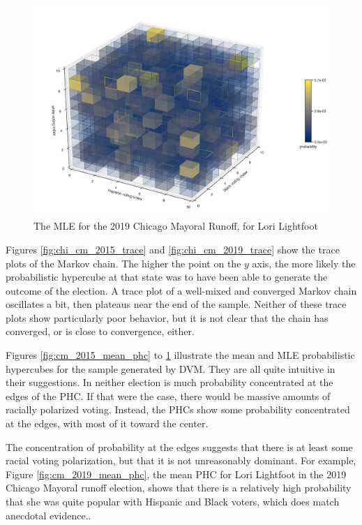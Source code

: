 \begin{figure}[ht]\centering
 \includegraphics[width=\linewidth]{figures/cm_2019_mle_phc.png}
 \caption{The MLE for the 2019 Chicago Mayoral Runoff, for Lori Lightfoot}
 \label{fig:cm_2019_mle_phc}
\end{figure}

Figures \ref{fig:chi_cm_2015_trace} and \ref{fig:chi_cm_2019_trace} show the trace plots of the Markov chain. The higher the point on the $y$ axis, the more likely the probabilistic hypercube at that state was to have been able to generate the outcome of the election. A trace plot of a well-mixed and converged Markov chain oscillates a bit, then plateaus near the end of the sample. Neither of these trace plots show particularly poor behavior, but it is not clear that the chain has converged, or is close to convergence, either.

Figures \ref{fig:cm_2015_mean_phc} to \ref{fig:cm_2019_mle_phc} illustrate the mean and MLE probabilistic hypercubes for the sample generated by DVM. They are all quite intuitive in their suggestions. In neither election is much probability concentrated at the edges of the PHC. If that were the case, there would be massive amounts of racially polarized voting. Instead, the PHCs show some probability concentrated at the edges, with most of it toward the center.

The concentration of probability at the edges suggests that there is at least some racial voting polarization, but that it is not unreasonably dominant. For example, Figure \ref{fig:cm_2019_mean_phc}, the mean PHC for Lori Lightfoot in the 2019 Chicago Mayoral runoff election, shows that there is a relatively high probability that she was quite popular with Hispanic and Black voters, which does match anecdotal evidence.\cite{negocios}.

